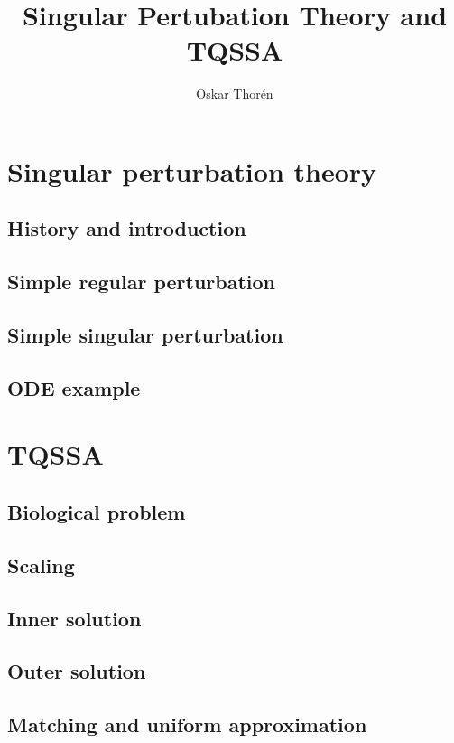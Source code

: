 \documentclass[12pt]{report}
\begin{document}


\title{Singular Pertubation Theory and TQSSA}
\author{Oskar Thor\'{e}n}

\maketitle

\chapter{Singular perturbation theory}

\section{History and introduction}
\section{Simple regular perturbation}
\section{Simple singular perturbation}
\section{ODE example}



\chapter{TQSSA}

\section{Biological problem}
\section{Scaling}
\section{Inner solution}
\section{Outer solution}
\section{Matching and uniform approximation}


\end{document}
